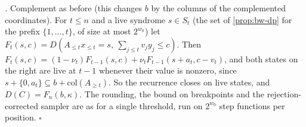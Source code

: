 \emph{.} Complement as before (this changes $b$ by the columns of
the complemented coordinates). For $t\le n$ and a live syndrome $s\in S_t$ (the set of
\cref{prop:bw-dp} for the prefix $\{1,\dots,t\}$, of size at most $2^{w_0}$) let
$F_t(s,c)=D(A_{\le t}x_{\le t}=s,\ \sum_{j\le t}v_jy_j\le c)$. Then
$F_t(s,c)=(1-\nu_t)F_{t-1}(s,c)+\nu_tF_{t-1}(s+a_t,c-v_t)$, and both states on the right
are live at $t-1$ whenever their value is nonzero, since $s+\{0,a_t\}\subseteq
b+\mathrm{col}(A_{\ge t})$. So the recurrence closes on live states, and $D(C)=F_n(b,\kappa)$.
The rounding, the bound on breakpoints and the rejection-corrected sampler are as for a
single threshold, run on $2^{w_0}$ step functions per position. \hfill$\square$
